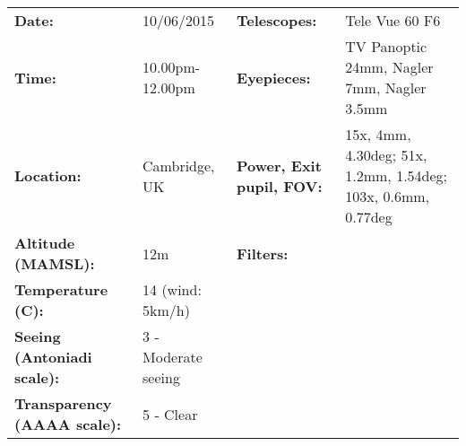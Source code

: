 \begin{tabular}{ p{1.7in} p{1.2in} p{1.5in} p{4.2in}}
{\bf Date:} & 10/06/2015 & {\bf Telescopes:} & Tele Vue 60 F6 \\ 
{\bf Time:} & 10.00pm-12.00pm & {\bf Eyepieces:} & TV Panoptic 24mm, Nagler 7mm, Nagler 3.5mm \\ 
{\bf Location:} & Cambridge, UK & {\bf Power, Exit pupil, FOV:} & 15x, 4mm, 4.30deg; 51x, 1.2mm, 1.54deg; 103x, 0.6mm, 0.77deg \\ 
{\bf Altitude (MAMSL):} & 12m & {\bf Filters:} &  \\ 
{\bf Temperature (C):} & 14 (wind: 5km/h) & & \\ 
{\bf Seeing (Antoniadi scale):} & 3 - Moderate seeing & & \\ 
{\bf Transparency (AAAA scale):} & 5 - Clear & & \\ 
\end{tabular}
\centering 
